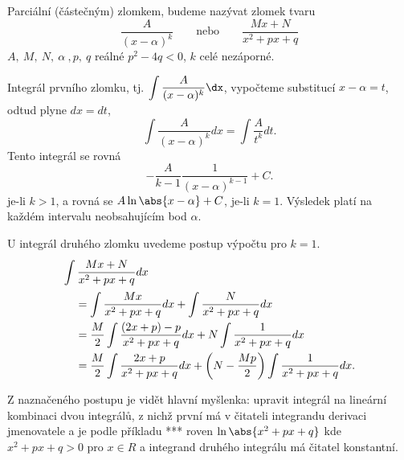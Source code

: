       \begin{definition} Parciální (částečným) zlomkem, budeme nazývat zlomek tvaru
         \begin{equation}
            \frac{A}{(x-\alpha)^k} \qquad\text{nebo}\qquad\frac{Mx + N}{x^2 + px +q}
         \end{equation}  
         $A,\ M,\ N,\ \alpha\ , p,\ q$ reálné $p^2-4q < 0$, $k$ celé nezáporné.         
      \end{definition}
      
      Integrál prvního zlomku, tj. $\displaystyle{\int\frac{A}{(x-\alpha)^k}\dx}$, vypočteme 
      substitucí $x-\alpha=t$, odtud plyne $dx = dt$,
      \begin{equation}\label{MA:int_ex_14}
        \int\frac{A}{(x-\alpha)^k}dx = \int\frac{A}{t^k}dt.
      \end{equation}
      Tento integrál se rovná
      \begin{equation}\label{MA:int_ex_16}
        -\frac{A}{k-1}\frac{1}{(x-\alpha)^{k-1}} + C.
      \end{equation}        
      je-li $k>1$, a rovná se $A\ln\abs{x-\alpha} + C$, je-li $k = 1$. Výsledek platí na každém
      intervalu neobsahujícím bod $\alpha$.
      
       U integrál druhého zlomku uvedeme postup výpočtu pro $k = 1$. 
      \begin{align*}
         \intertext{\(\displaystyle\int{\frac{Mx + N}{x^2+px+q}dx}\)}
           \quad &=  \int{\frac{Mx}{x^2+px+q}dx} + \int{\frac{N}{x^2+px+q}dx}                     
           \\  
           \quad &=  \frac{M}{2}\int{\frac{(2x + p) - p}{x^2+px+q}dx} + 
                     N\int{\frac{1}{x^2+px+q}dx}                                                   \\ 
           \quad &=  \frac{M}{2}\int{\frac{2x + p}{x^2+px+q}dx} + 
                      \left(N-\frac{Mp}{2}\right)\int{\frac{1}{x^2+px+q}dx.}                   
      \end{align*}  
      
      Z naznačeného postupu je vidět hlavní myšlenka: upravit integrál na lineární kombinaci dvou 
      integrálů, z nichž první má v čitateli integrandu derivaci jmenovatele a je podle příkladu 
      *** roven $\ln\abs{x^2+px+q}$ kde $x^2+px+q >0$ pro $x\in R$ a integrand druhého integrálu má 
      čitatel konstantní.
      
